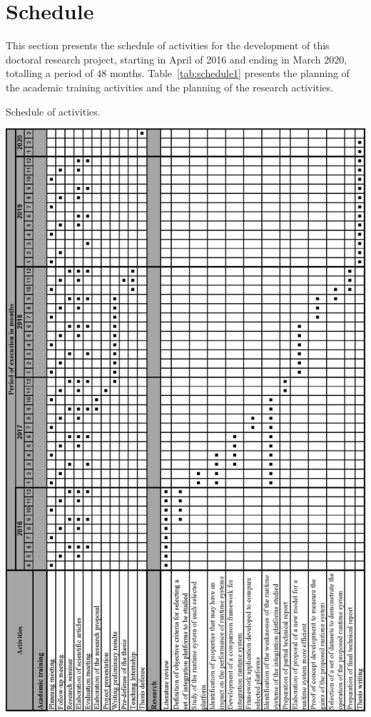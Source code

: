 \section{Schedule}
\label{sec:schedule}

\noindent 

This section presents the schedule of activities for the development of this doctoral research project, starting in April of 2016 and ending in March 2020, totalling a period of 48 months.
Table~\ref{tab:schedule1} presents the planning of the academic training activities and the planning of the research activities.

\begin{table}[!htbp]
	\centering
	\caption{Schedule of activities.}
    \includegraphics[scale=0.8]{./figs/chrono.eps}
	\label{tab:schedule1}
\end{table}